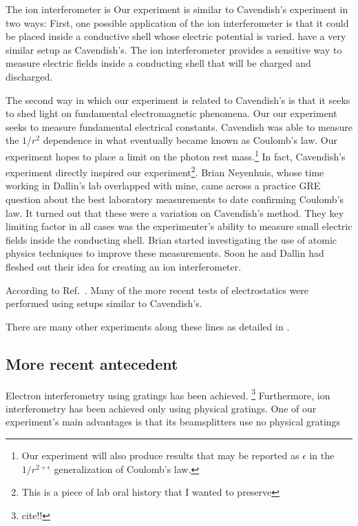The ion interferometer is Our experiment is similar to Cavendish's experiment in two ways: First, one possible application of the ion interferometer is that it could be placed inside a conductive shell whose electric potential is varied. have a very similar setup as Cavendish's. The ion interferometer provides a sensitive way to measure electric fields inside a conducting shell that will be charged and discharged. 

The second way in which our experiment is related to Cavendish's is that it seeks to shed light on fundamental electromagnetic phenomena. Our our experiment seeks to measure fundamental electrical constants. Cavendish was able to measure the $1/r^2$ dependence in what eventually became known as Coulomb's law. Our experiment hopes to place a limit on the photon rest mass.\footnote{Our experiment will also produce results that may be reported as $\epsilon$ in the $1/r^{2+\epsilon}$ generalization of Coulomb's law.}
In fact, Cavendish's experiment directly inspired our experiment\footnote{This is a piece of lab oral history that I wanted to preserve}. Brian Neyenhuis, whose time working in Dallin's lab overlapped with mine, came across a practice GRE question about the best laboratory measurements to date confirming Coulomb's law. It turned out that these were a variation on Cavendish's method. They key limiting factor in all cases was the experimenter's ability to measure small electric fields inside the conducting shell. Brian started investigating the use of atomic physics techniques to improve these measurements. Soon he and Dallin had fleshed out their idea for creating an ion interferometer.  

According to Ref.\ \cite{jackson}. Many of the more recent tests of electrostatics were performed using setups similar to Cavendish's. 

There are many other experiments along these lines as detailed in \cite{PhotonMassSurvey}. 

\subsection{More recent antecedent}
Electron interferometry using gratings has been achieved. \footnote{cite!!} Furthermore, ion interferometry has been achieved only using physical gratings. One of our experiment's main advantages is that its beamsplitters use no physical gratings

